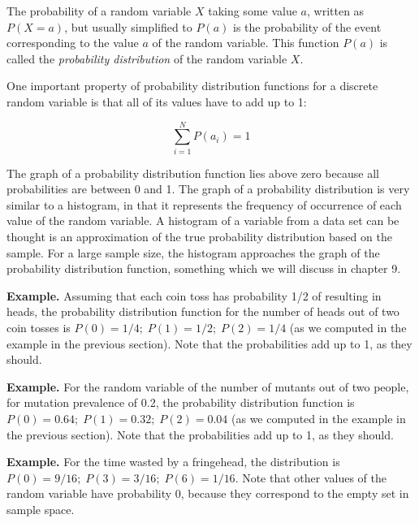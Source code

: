 \documentclass[
  letterpaper,
  DIV=11,
  numbers=noendperiod]{scrreprt}
\begin{document}
\begin{tcolorbox}[enhanced jigsaw, arc=.35mm, colframe=quarto-callout-note-color-frame, left=2mm, opacitybacktitle=0.6, breakable, title=\textcolor{quarto-callout-note-color}{\faInfo}\hspace{0.5em}{Note}, toprule=.15mm, coltitle=black, bottomtitle=1mm, toptitle=1mm, colback=white, leftrule=.75mm, colbacktitle=quarto-callout-note-color!10!white, titlerule=0mm, opacityback=0, rightrule=.15mm, bottomrule=.15mm]

The probability of a random variable \(X\) taking some value \(a\),
written as \(P(X=a)\), but usually simplified to \(P(a)\) is the
probability of the event corresponding to the value \(a\) of the random
variable. This function \(P(a)\) is called the \emph{probability
distribution} of the random variable \(X\).

\end{tcolorbox}

One important property of probability distribution functions for a
discrete random variable is that all of its values have to add up to 1:

\[\sum_{i=1}^N P(a_i) =1\]

The graph of a probability distribution function lies above zero because
all probabilities are between 0 and 1. The graph of a probability
distribution is very similar to a histogram, in that it represents the
frequency of occurrence of each value of the random variable. A
histogram of a variable from a data set can be thought is an
approximation of the true probability distribution based on the sample.
For a large sample size, the histogram approaches the graph of the
probability distribution function, something which we will discuss in
chapter 9.

\textbf{Example.} Assuming that each coin toss has probability 1/2 of
resulting in heads, the probability distribution function for the number
of heads out of two coin tosses is
\(P(0) = 1/4; \; P(1) = 1/2; \; P(2) = 1/4\) (as we computed in the
example in the previous section). Note that the probabilities add up to
1, as they should.

\textbf{Example.} For the random variable of the number of mutants out
of two people, for mutation prevalence of 0.2, the probability
distribution function is \(P(0) = 0.64; \; P(1) = 0.32; \; P(2) = 0.04\)
(as we computed in the example in the previous section). Note that the
probabilities add up to 1, as they should.

\textbf{Example.} For the time wasted by a fringehead, the distribution
is \(P(0)= 9/16; \; P(3) = 3/16; \; P(6) = 1/16\). Note that other
values of the random variable have probability 0, because they
correspond to the empty set in sample space.
\end{document}
